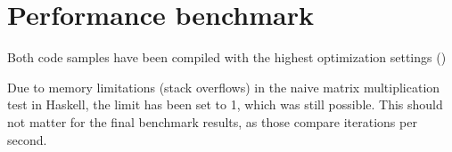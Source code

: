 \chapter{Performance benchmark}
\label{app:performance_benchmark}
Both code samples have been compiled with the highest optimization settings ()



Due to memory limitations (stack overflows) in the naive matrix multiplication test in Haskell, the limit has been set to 1, which was still possible. This should not matter for the final benchmark results, as those compare iterations per second.

